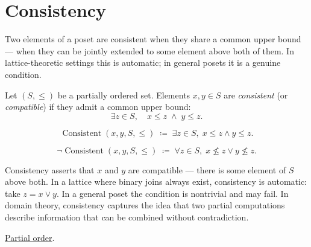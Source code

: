 
\section{Consistency}
\label{sec:consistency}

\begin{tcolorbox}[
  colback=gray!6,
  colframe=gray!40,
  arc=2pt,
  left=8pt, right=8pt, top=6pt, bottom=6pt,
  title={\small\textbf{Toolkit: Consistency}},
  fonttitle=\small\bfseries
]
Two elements of a poset are consistent when they share a common upper
bound — when they can be jointly extended to some element above both of
them.  In lattice-theoretic settings this is automatic; in general posets
it is a genuine condition.
\end{tcolorbox}


\begin{definition}[Consistency]
\label{def:consistency}
Let $(S, \leq)$ be a partially ordered set.  Elements $x, y \in S$ are
\emph{consistent} (or \emph{compatible}) if they admit a common upper
bound:
\[
\exists z \in S, \quad x \leq z \;\land\; y \leq z.
\]
\end{definition}

\begin{remark*}
\[
\operatorname{Consistent}(x, y, S, \leq)
\;\coloneqq\;
\exists z \in S,\; x \leq z \land y \leq z.
\]
\end{remark*}

\begin{remark*}
\[
\neg\operatorname{Consistent}(x, y, S, \leq)
\;\coloneqq\;
\forall z \in S,\; x \not\leq z \lor y \not\leq z.
\]
\end{remark*}

\begin{remark*}[Interpretation]
Consistency asserts that $x$ and $y$ are compatible — there is some
element of $S$ above both.  In a lattice where binary joins always exist,
consistency is automatic: take $z = x \vee y$.  In a general poset the
condition is nontrivial and may fail.  In domain theory, consistency
captures the idea that two partial computations describe information that
can be combined without contradiction.
\end{remark*}

\begin{remark*}[Dependencies]
\hyperref[def:partial-order]{Partial order}.
\end{remark*}
